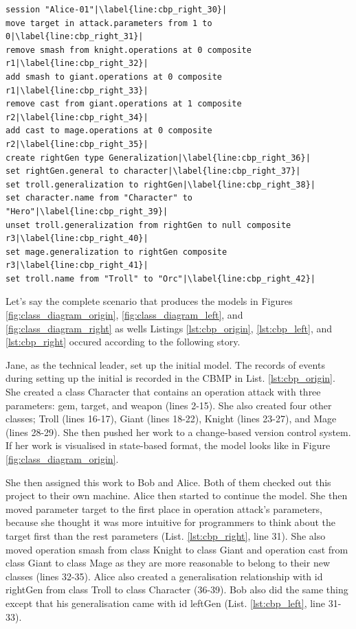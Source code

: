 \vspace{-20pt}
\begin{lstlisting}[firstnumber=30,style=eol,escapechar=|,caption={The appended events made by Alice to produce the right version in Figure \ref{fig:class_diagram_right} (right version).},label=lst:cbp_right]
session "Alice-01"|\label{line:cbp_right_30}|
move target in attack.parameters from 1 to 0|\label{line:cbp_right_31}|
remove smash from knight.operations at 0 composite r1|\label{line:cbp_right_32}|
add smash to giant.operations at 0 composite r1|\label{line:cbp_right_33}|
remove cast from giant.operations at 1 composite r2|\label{line:cbp_right_34}|
add cast to mage.operations at 0 composite r2|\label{line:cbp_right_35}|
create rightGen type Generalization|\label{line:cbp_right_36}|
set rightGen.general to character|\label{line:cbp_right_37}|
set troll.generalization to rightGen|\label{line:cbp_right_38}|
set character.name from "Character" to "Hero"|\label{line:cbp_right_39}|
unset troll.generalization from rightGen to null composite r3|\label{line:cbp_right_40}|
set mage.generalization to rightGen composite r3|\label{line:cbp_right_41}|
set troll.name from "Troll" to "Orc"|\label{line:cbp_right_42}|
\end{lstlisting}

Let's say the complete scenario that produces the models in Figures \ref{fig:class_diagram_origin}, \ref{fig:class_diagram_left}, and \ref{fig:class_diagram_right} as wells Listings \ref{lst:cbp_origin}, \ref{lst:cbp_left}, and \ref{lst:cbp_right} occured according to the following story.

Jane, as the technical leader, set up the initial model. The records of events during setting up the initial is recorded in the CBMP in List. \ref{lst:cbp_origin}. She created a class \textsf{Character} that contains an operation \textsf{attack} with three parameters: \textsf{gem}, \textsf{target}, and \textsf{weapon} (lines 2-15). She also created four other classes; \textsf{Troll} (lines 16-17), \textsf{Giant} (lines 18-22), \textsf{Knight} (lines 23-27), and \textsf{Mage} (lines 28-29). She then pushed her work to a change-based version control system. If her work is visualised in state-based format, the model looks like in Figure \ref{fig:class_diagram_origin}.

She then assigned this work to Bob and Alice. Both of them checked out this project to their own machine. Alice then started to continue the model. She then moved parameter \textsf{target} to the first place in operation \textsf{attack}'s parameters, because she thought it was more intuitive for programmers to think about the \textsf{target} first than the rest parameters (List. \ref{lst:cbp_right}, line 31). She also moved operation \textsf{smash} from class \textsf{Knight} to class \textsf{Giant} and operation \textsf{cast} from class \textsf{Giant} to class \textsf{Mage} as they are more reasonable to belong to their new classes (lines 32-35). Alice also created a generalisation relationship with id \textsf{rightGen} from class \textsf{Troll} to class \textsf{Character} (36-39). Bob also did the same thing except that his generalisation came with id \textsf{leftGen} (List. \ref{lst:cbp_left}, line 31-33). 

